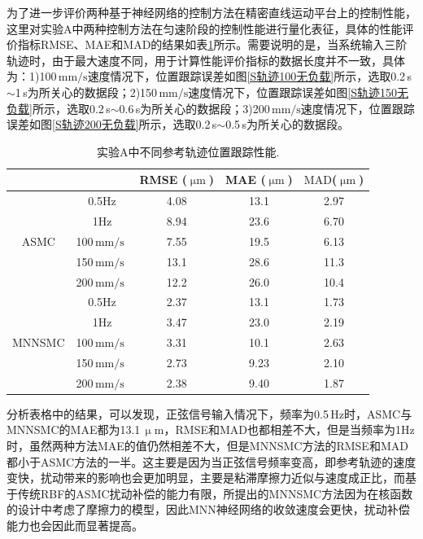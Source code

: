 为了进一步评价两种基于神经网络的控制方法在精密直线运动平台上的控制性能，这里对实验A中两种控制方法在匀速阶段的控制性能进行量化表征，具体的性能评价指标RMSE、MAE和MAD的结果如表\ref{实验A}所示。需要说明的是，当系统输入三阶轨迹时，由于最大速度不同，用于计算性能评价指标的数据长度并不一致，具体为：1)100$\,\text{mm/s}$速度情况下，位置跟踪误差如图\ref{S轨迹100无负载}所示，选取0.2\,s$\sim$1\,s为所关心的数据段；2)150$\,\text{mm/s}$速度情况下，位置跟踪误差如图\ref{S轨迹150无负载}所示，选取0.2\,s$\sim$0.6\,s为所关心的数据段；3)200$\,\text{mm/s}$速度情况下，位置跟踪误差如图\ref{S轨迹200无负载}所示，选取0.2\,s$\sim$0.5\,s为所关心的数据段。
\begin{table}[H]
	\caption{实验A中不同参考轨迹位置跟踪性能.}
	\label{实验A}
	\centering
	\setlength{\tabcolsep}{3mm} 
	\begin{tabular}{ccccc}
		\toprule[1.5pt]
		& \text{参考轨迹} & RMSE ($\text{$\upmu$m}$) & MAE ($\text{$\upmu$m}$) & $\text{MAD}$($\text{$\upmu$m}$)   \\ 
		\midrule
		\multirow{5}{*}{ASMC}     
		& 0.5Hz         & 4.08      & 13.1 &2.97     \\ 
		& 1Hz           & 8.94      & 23.6 &6.70     \\ 
		& 100\,$\text{mm/s }$            & 7.55      & 19.5 &6.13   \\  
		& 150\,$\text{mm/s }$             & 13.1      & 28.6 &11.3     \\ 
		& 200\,$\text{mm/s }$             & 12.2      & 26.0 &10.4     \\
		\midrule
		\multirow{5}{*}{MNNSMC} 
		& 0.5Hz           & 2.37      & 13.1 &1.73    \\ 
		& 1Hz             & 3.47      & 23.0 &2.19     \\ 
		& 100\,$\text{mm/s }$            & 3.31      & 10.1 &2.63  \\  
		& 150\,$\text{mm/s }$             & 2.73      & 9.23 &2.10     \\ 
		& 200\,$\text{mm/s }$             & 2.38      & 9.40 &1.87    \\
		\bottomrule[1.5pt]
	\end{tabular}
\end{table}

分析表格中的结果，可以发现，正弦信号输入情况下，频率为0.5\,Hz时，ASMC与MNNSMC的MAE都为13.1\,$\upmu$$\text{m}$，RMSE和MAD也都相差不大，但是当频率为1Hz时，虽然两种方法MAE的值仍然相差不大，但是MNNSMC方法的RMSE和MAD都小于ASMC方法的一半。这主要是因为当正弦信号频率变高，即参考轨迹的速度变快，扰动带来的影响也会更加明显，主要是粘滞摩擦力近似与速度成正比，而基于传统RBF的ASMC扰动补偿的能力有限，所提出的MNNSMC方法因为在核函数的设计中考虑了摩擦力的模型，因此MNN神经网络的收敛速度会更快，扰动补偿能力也会因此而显著提高。

